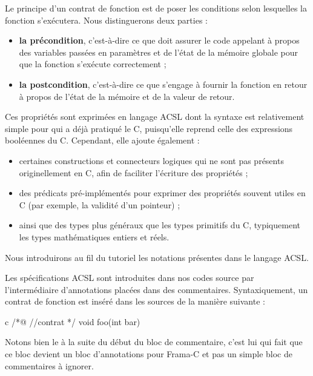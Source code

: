 Le principe d'un contrat de fonction est de poser les conditions selon
lesquelles la fonction s'exécutera. Nous distinguerons deux parties :
\begin{itemize}
\item \textbf{la précondition}, c'est-à-dire ce que doit assurer le code
      appelant à propos des variables passées en paramètres et de l'état de
      la mémoire globale pour que la fonction s'exécute correctement ;
\item \textbf{la postcondition}, c'est-à-dire ce que s'engage à fournir la
      fonction en retour à propos de l'état de la mémoire et de la valeur de
      retour.
\end{itemize}


Ces propriétés sont exprimées en langage ACSL dont la syntaxe est relativement
simple pour qui a déjà pratiqué le C, puisqu'elle reprend celle des expressions
booléennes du C. Cependant, elle ajoute également :
\begin{itemize}
\item certaines constructions et connecteurs logiques qui ne sont pas présents
originellement en C, afin de faciliter l'écriture des propriétés ;
\item des prédicats pré-implémentés pour exprimer des propriétés souvent utiles
en C (par exemple, la validité d'un pointeur) ;
\item ainsi que des types plus généraux que les types primitifs du C,
typiquement les types mathématiques entiers et réels.
\end{itemize}


Nous introduirons au fil du tutoriel les notations présentes dans le
langage ACSL.



Les spécifications ACSL sont introduites dans nos codes source par
l'intermédiaire d'annotations placées dans des commentaires. Syntaxiquement,
un contrat de fonction est inséré dans les sources de la manière suivante :



\begin{CodeBlock}{c}
/*@
  //contrat
*/
void foo(int bar){

}
\end{CodeBlock}



Notons bien le  à la suite du début du bloc de commentaire, c'est lui qui
fait que ce bloc devient un bloc d'annotations pour Frama-C et pas un simple
bloc de commentaires à ignorer.



